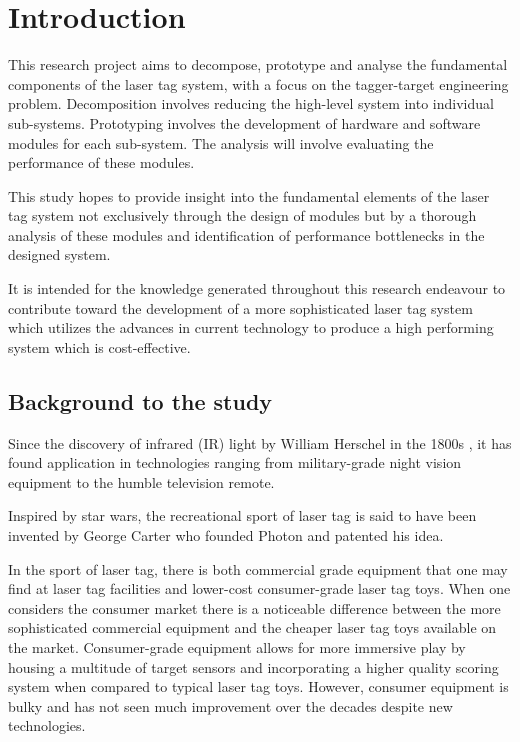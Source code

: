 \chapter{Introduction}
\label{ch_introduction}

This research project aims to decompose, prototype and analyse the fundamental components of the laser tag system, with a focus on the tagger-target engineering problem. Decomposition involves reducing the high-level system into individual sub-systems. Prototyping involves the development of hardware and software modules for each sub-system. The analysis will involve evaluating the performance of these modules.

This study hopes to provide insight into the fundamental elements of the laser tag system not exclusively through the design of modules but by a thorough analysis of these modules and identification of performance bottlenecks in the designed system.

It is intended for the knowledge generated throughout this research endeavour to contribute toward the development of a more sophisticated laser tag system which utilizes the advances in current technology to produce a high performing system which is cost-effective.

\section{Background to the study}
Since the discovery of infrared (IR) light by William Herschel in the 1800s \cite{Rowan-Robinson2013}, it has found application in technologies ranging from military-grade night vision equipment to the humble television remote.

Inspired by star wars, the recreational sport of laser tag is said to have been invented by George Carter who founded Photon and patented his idea\cite{Carter1986}.

In the sport of laser tag, there is both commercial grade equipment that one may find at laser tag facilities and lower-cost consumer-grade laser tag toys. When one considers the consumer market there is a noticeable difference between the more sophisticated commercial equipment and the cheaper laser tag toys available on the market. Consumer-grade equipment allows for more immersive play by housing a multitude of target sensors and incorporating a higher quality scoring system when compared to typical laser tag toys. However, consumer equipment is bulky and has not seen much improvement over the decades despite new technologies.

